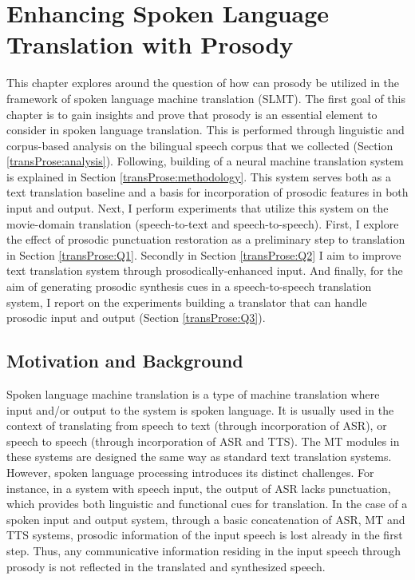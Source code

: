 \chapter{Enhancing Spoken Language Translation with Prosody}
\label{chapter:transProse}
This chapter explores around the question of how can prosody be utilized in the framework of spoken language machine translation (SLMT). The first goal of this chapter is to gain insights and prove that prosody is an essential element to consider in spoken language translation. This is performed through linguistic and corpus-based analysis on the bilingual speech corpus that we collected (Section \ref{transProse:analysis}). Following, building of a neural machine translation system is explained in Section \ref{transProse:methodology}. This system serves both as a text translation baseline and a basis for incorporation of prosodic features in both input and output. Next, I perform experiments that utilize this system on the movie-domain translation (speech-to-text and speech-to-speech). First, I explore the effect of prosodic punctuation restoration as a preliminary step to translation in Section \ref{transProse:Q1}. Secondly in Section \ref{transProse:Q2} I aim to improve text translation system through prosodically-enhanced input. And finally, for the aim of generating prosodic synthesis cues in a speech-to-speech translation system, I report on the experiments building a translator that can handle prosodic input and output (Section \ref{transProse:Q3}). 

\section{Motivation and Background}
Spoken language machine translation is a type of machine translation where input and/or output to the system is spoken language. It is usually used in the context of translating from speech to text (through incorporation of ASR), or speech to speech (through incorporation of ASR and TTS). The MT modules in these systems are designed the same way as standard text translation systems. However, spoken language processing introduces its distinct challenges. For instance, in a system with speech input, the output of ASR lacks punctuation, which provides both linguistic and functional cues for translation. In the case of a spoken input and output system, through a basic concatenation of ASR, MT and TTS systems, prosodic information of the input speech is lost already in the first step. Thus, any communicative information residing in the input speech through prosody is not reflected in the translated and synthesized speech. 

